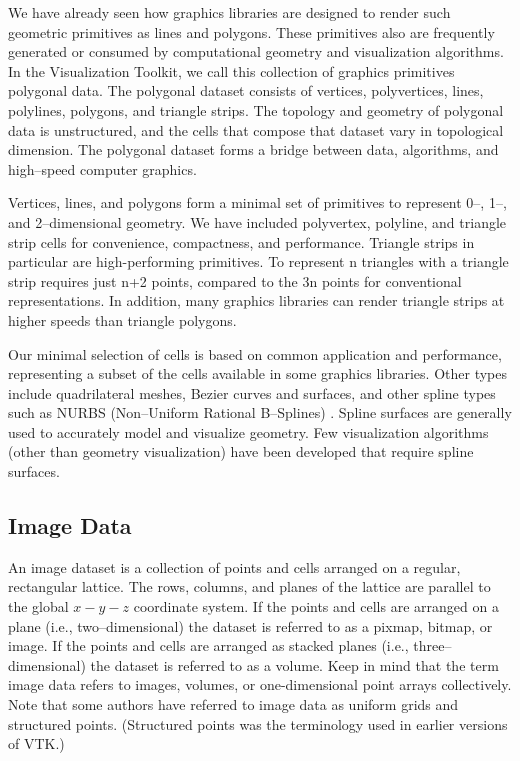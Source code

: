 We have already seen how graphics libraries are designed to render such geometric primitives as lines and polygons. These primitives also are frequently generated or consumed by computational geometry and visualization algorithms. In the Visualization Toolkit, we call this collection of graphics primitives polygonal data. The polygonal dataset consists of vertices, polyvertices, lines, polylines, polygons, and triangle strips. The topology and geometry of polygonal data is unstructured, and the cells that compose that dataset vary in topological dimension. The polygonal dataset forms a bridge between data, algorithms, and high--speed computer graphics.

Vertices, lines, and polygons form a minimal set of primitives to represent 0--, 1--, and 2--dimensional geometry. We have included polyvertex, polyline, and triangle strip cells for convenience, compactness, and performance. Triangle strips in particular are high-performing primitives. To represent n triangles with a triangle strip requires just n+2 points, compared to the 3n points for conventional representations. In addition, many graphics libraries can render triangle strips at higher speeds than triangle polygons.

Our minimal selection of cells is based on common application and performance, representing a subset of the cells available in some graphics libraries. Other types include quadrilateral meshes, Bezier curves and surfaces, and other spline types such as NURBS (Non--Uniform Rational B--Splines) \cite{Mortenson85}. Spline surfaces are generally used to accurately model and visualize geometry. Few visualization algorithms (other than geometry visualization) have been developed that require spline surfaces.

\subsection{Image Data}
\label{subsec:image_data}

An image dataset is a collection of points and cells arranged on a regular, rectangular lattice. The rows, columns, and planes of the lattice are parallel to the global $x-y-z$ coordinate system. If the points and cells are arranged on a plane (i.e., two--dimensional) the dataset is referred to as a pixmap, bitmap, or image. If the points and cells are arranged as stacked planes (i.e., three--dimensional) the dataset is referred to as a volume. Keep in mind that the term image data refers to images, volumes, or one-dimensional point arrays collectively. Note that some authors have referred to image data as uniform grids and structured points. (Structured points was the terminology used in earlier versions of VTK.)

